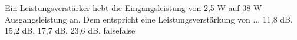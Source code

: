     {Ein Leistungsverstärker hebt die Eingangsleistung von 2,5 W auf 38 W Ausgangsleistung an. Dem entspricht eine Leistungsverstärkung von ...}
    {11,8 dB.}
    {15,2 dB.}
    {17,7 dB.}
    {23,6 dB.}
    {false}{false}